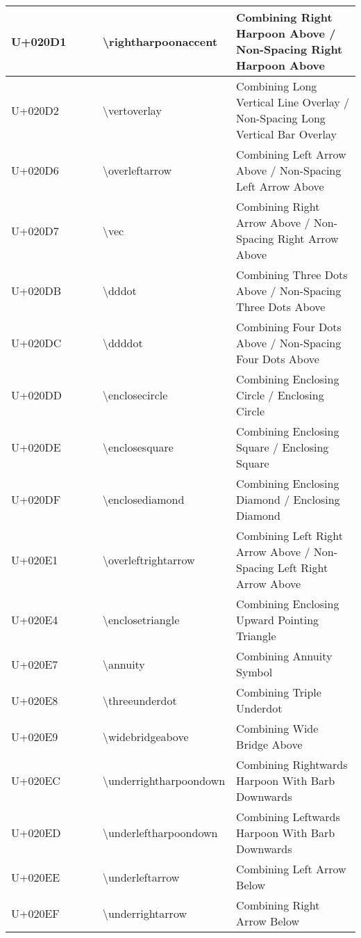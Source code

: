 \begin{table}[h]
\begin{tabulary}{\linewidth}{|L|L|L|L|}
\hline
U+020D1 &  ⃑  & {\textbackslash}rightharpoonaccent & Combining Right Harpoon Above / Non-Spacing Right Harpoon Above \\
\hline
U+020D2 &  ⃒  & {\textbackslash}vertoverlay & Combining Long Vertical Line Overlay / Non-Spacing Long Vertical Bar Overlay \\
\hline
U+020D6 &  ⃖  & {\textbackslash}overleftarrow & Combining Left Arrow Above / Non-Spacing Left Arrow Above \\
\hline
U+020D7 &  ⃗  & {\textbackslash}vec & Combining Right Arrow Above / Non-Spacing Right Arrow Above \\
\hline
U+020DB &  ⃛  & {\textbackslash}dddot & Combining Three Dots Above / Non-Spacing Three Dots Above \\
\hline
U+020DC &  ⃜  & {\textbackslash}ddddot & Combining Four Dots Above / Non-Spacing Four Dots Above \\
\hline
U+020DD &  ⃝  & {\textbackslash}enclosecircle & Combining Enclosing Circle / Enclosing Circle \\
\hline
U+020DE &  ⃞  & {\textbackslash}enclosesquare & Combining Enclosing Square / Enclosing Square \\
\hline
U+020DF &  ⃟  & {\textbackslash}enclosediamond & Combining Enclosing Diamond / Enclosing Diamond \\
\hline
U+020E1 &  ⃡  & {\textbackslash}overleftrightarrow & Combining Left Right Arrow Above / Non-Spacing Left Right Arrow Above \\
\hline
U+020E4 &  ⃤  & {\textbackslash}enclosetriangle & Combining Enclosing Upward Pointing Triangle \\
\hline
U+020E7 &  ⃧  & {\textbackslash}annuity & Combining Annuity Symbol \\
\hline
U+020E8 &  ⃨  & {\textbackslash}threeunderdot & Combining Triple Underdot \\
\hline
U+020E9 &  ⃩  & {\textbackslash}widebridgeabove & Combining Wide Bridge Above \\
\hline
U+020EC &  ⃬  & {\textbackslash}underrightharpoondown & Combining Rightwards Harpoon With Barb Downwards \\
\hline
U+020ED &  ⃭  & {\textbackslash}underleftharpoondown & Combining Leftwards Harpoon With Barb Downwards \\
\hline
U+020EE &  ⃮  & {\textbackslash}underleftarrow & Combining Left Arrow Below \\
\hline
U+020EF &  ⃯  & {\textbackslash}underrightarrow & Combining Right Arrow Below \\

\end{tabulary}
\end{table}
